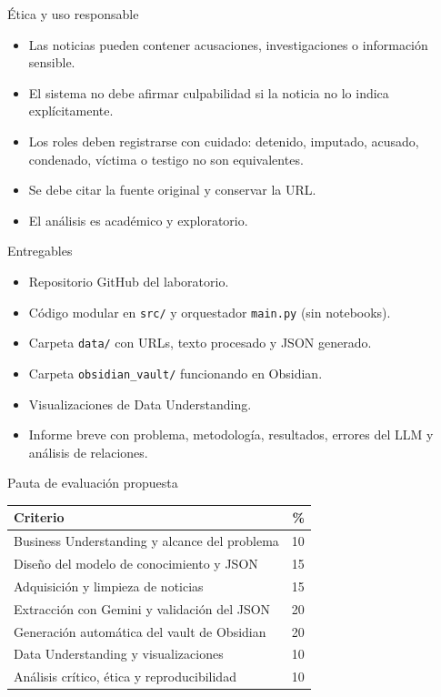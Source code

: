 \documentclass[11pt,aspectratio=169]{beamer}
\newcommand{\code}[1]{\texttt{#1}}
\begin{document}
\begin{frame}{Ética y uso responsable}
\small
\begin{itemize}[<+->]
\item Las noticias pueden contener acusaciones, investigaciones o información sensible.
\item El sistema no debe afirmar culpabilidad si la noticia no lo indica explícitamente.
\item Los roles deben registrarse con cuidado: detenido, imputado, acusado, condenado, víctima o testigo no son equivalentes.
\item Se debe citar la fuente original y conservar la URL.
\item El análisis es académico y exploratorio.
\end{itemize}
\end{frame}

\begin{frame}{Entregables}
\small
\begin{itemize}[<+->]
\item Repositorio GitHub del laboratorio.
\item Código modular en \code{src/} y orquestador \code{main.py} (sin notebooks).
\item Carpeta \code{data/} con URLs, texto procesado y JSON generado.
\item Carpeta \code{obsidian\_vault/} funcionando en Obsidian.
\item Visualizaciones de Data Understanding.
\item Informe breve con problema, metodología, resultados, errores del LLM y análisis de relaciones.
\end{itemize}
\end{frame}

\begin{frame}{Pauta de evaluación propuesta}
\small
\begin{center}
\begin{tabular}{p{8.2cm}r}
\toprule
\textbf{Criterio} & \textbf{\%} \\
\midrule
Business Understanding y alcance del problema & 10 \\
Diseño del modelo de conocimiento y JSON & 15 \\
Adquisición y limpieza de noticias & 15 \\
Extracción con Gemini y validación del JSON & 20 \\
Generación automática del vault de Obsidian & 20 \\
Data Understanding y visualizaciones & 10 \\
Análisis crítico, ética y reproducibilidad & 10 \\
\bottomrule
\end{tabular}
\end{center}
\end{frame}
\end{document}
